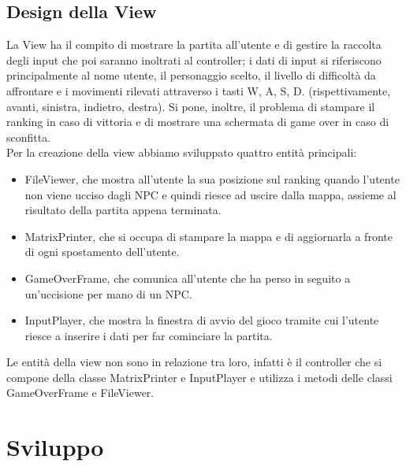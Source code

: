 \documentclass[12pt, letterpaper]{article}
\begin{document}
    \subsection{Design della View}
        La View ha il compito di mostrare la partita all'utente e di gestire la raccolta degli input che poi saranno inoltrati al controller; i dati di input si riferiscono principalmente al nome utente, il personaggio scelto, il livello di difficoltà da affrontare e i movimenti rilevati attraverso i tasti W, A, S, D. (rispettivamente, avanti, sinistra, indietro, destra). Si pone, inoltre, il problema di stampare il ranking in caso di vittoria e di mostrare una schermata di game over in caso di sconfitta.\\
        Per la creazione della view abbiamo sviluppato quattro entità principali:
        \begin{itemize}
            \item FileViewer, che mostra all'utente la sua posizione sul ranking quando l'utente non viene ucciso dagli NPC e quindi riesce
            ad uscire dalla mappa, assieme al risultato della partita appena terminata.
            \item MatrixPrinter, che si occupa di stampare la mappa e di aggiornarla a fronte di ogni spostamento dell'utente.
            \item GameOverFrame, che comunica all'utente che ha perso in seguito a un'uccisione per mano di un NPC.
            \item InputPlayer, che mostra la finestra di avvio del gioco tramite cui l'utente riesce a inserire i dati per far cominciare la partita.
        \end{itemize}
        Le entità della view non sono in relazione tra loro, infatti è il controller che si compone della classe MatrixPrinter e InputPlayer e utilizza i metodi delle classi GameOverFrame e FileViewer.
\newpage
\section{Sviluppo}
\end{document}

